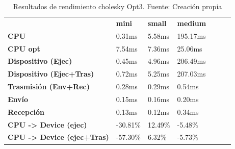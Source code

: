 \begin{table}[H]
    \centering
    \begin{tabular}{lllllll}
    \rowcolor[HTML]{DAE8FC} \ &  \textbf{mini} &  \textbf{	small} &  \textbf{	medium} \\
    \cellcolor[HTML]{DAE8FC} \textbf{CPU} & 0.31ms & 	5.58ms & 	195.17ms \\
    \rowcolor[HTML]{EFEFEF} \cellcolor[HTML]{DAE8FC} \textbf{CPU opt} & 7.54ms & 	7.36ms & 	25.06ms \\
    \cellcolor[HTML]{DAE8FC} \textbf{Dispositivo (Ejec)} & 0.45ms & 	4.96ms & 	206.49ms \\
    \rowcolor[HTML]{EFEFEF} \cellcolor[HTML]{DAE8FC} \textbf{Dispositivo (Ejec+Tras)} & 0.72ms & 	5.25ms & 	207.03ms \\
    \cellcolor[HTML]{DAE8FC} \textbf{Trasmisión (Env+Rec)} & 0.28ms & 	0.29ms & 	0.54ms \\
    \rowcolor[HTML]{EFEFEF} \cellcolor[HTML]{DAE8FC} \textbf{Envío} & 0.15ms & 	0.16ms & 	0.20ms \\
    \cellcolor[HTML]{DAE8FC} \textbf{Recepción} & 0.13ms & 	0.12ms & 	0.34ms \\
    \rowcolor[HTML]{EFEFEF} \cellcolor[HTML]{DAE8FC} \textbf{CPU -> Device (ejec)} & -30.81\% & 	12.49\% & 	-5.48\% \\
    \cellcolor[HTML]{DAE8FC} \textbf{CPU -> Device (ejec+Tras)} & -57.30\% & 	6.32\% & 	-5.73\% \\
    \end{tabular}
    \caption[Resultados de rendimiento cholesky Opt3]{{Resultados de rendimiento cholesky Opt3. Fuente: Creación propia}}
    \label{table_test_cholesky_Opt3_hw_performanceResults}
\end{table}